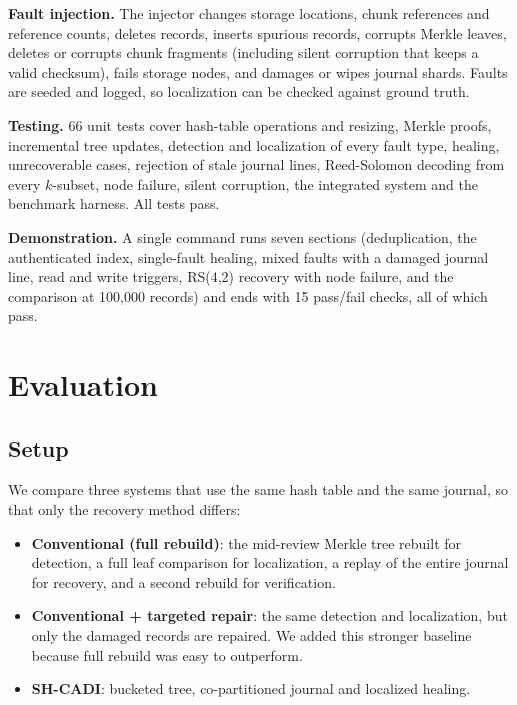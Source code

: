 \documentclass[conference]{IEEEtran}
\begin{document}
\textbf{Fault injection.} The injector changes storage locations, chunk references and reference counts, deletes records, inserts spurious records, corrupts Merkle leaves, deletes or corrupts chunk fragments (including silent corruption that keeps a valid checksum), fails storage nodes, and damages or wipes journal shards. Faults are seeded and logged, so localization can be checked against ground truth.

\textbf{Testing.} 66 unit tests cover hash-table operations and resizing, Merkle proofs, incremental tree updates, detection and localization of every fault type, healing, unrecoverable cases, rejection of stale journal lines, Reed-Solomon decoding from every $k$-subset, node failure, silent corruption, the integrated system and the benchmark harness. All tests pass.

\textbf{Demonstration.} A single command runs seven sections (deduplication, the authenticated index, single-fault healing, mixed faults with a damaged journal line, read and write triggers, RS(4,2) recovery with node failure, and the comparison at 100,000 records) and ends with 15 pass/fail checks, all of which pass.

\section{Evaluation}
\label{sec:eval}

\subsection{Setup}

We compare three systems that use the same hash table and the same journal, so that only the recovery method differs:
\begin{itemize}
\item \textbf{Conventional (full rebuild)}: the mid-review Merkle tree rebuilt for detection, a full leaf comparison for localization, a replay of the entire journal for recovery, and a second rebuild for verification.
\item \textbf{Conventional + targeted repair}: the same detection and localization, but only the damaged records are repaired. We added this stronger baseline because full rebuild was easy to outperform.
\item \textbf{SH-CADI}: bucketed tree, co-partitioned journal and localized healing.
\end{itemize}
\end{document}
